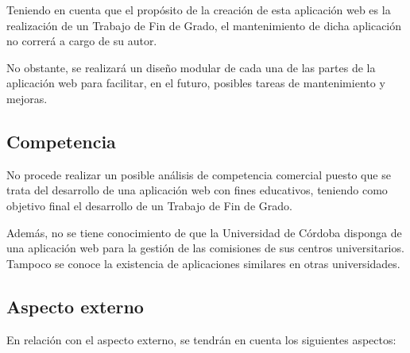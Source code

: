 Teniendo en cuenta que el propósito de la creación de esta aplicación web es la realización de un Trabajo de Fin de Grado, el mantenimiento de dicha aplicación no correrá a cargo de su autor.

 No obstante, se realizará un diseño modular de cada una de las partes de la aplicación web para facilitar, en el futuro, posibles tareas de mantenimiento y mejoras.


\subsection{Competencia}

 No procede realizar un posible análisis de competencia comercial puesto que se trata del desarrollo de una aplicación web con fines educativos, teniendo como objetivo final el desarrollo de un Trabajo de Fin de Grado.

 Además, no se tiene conocimiento de que la Universidad de Córdoba disponga de una aplicación web para la gestión de las comisiones de sus centros universitarios. Tampoco se conoce la existencia de aplicaciones similares en otras universidades.


\subsection{Aspecto externo}

En relación con el aspecto externo, se tendrán en cuenta los siguientes aspectos:

